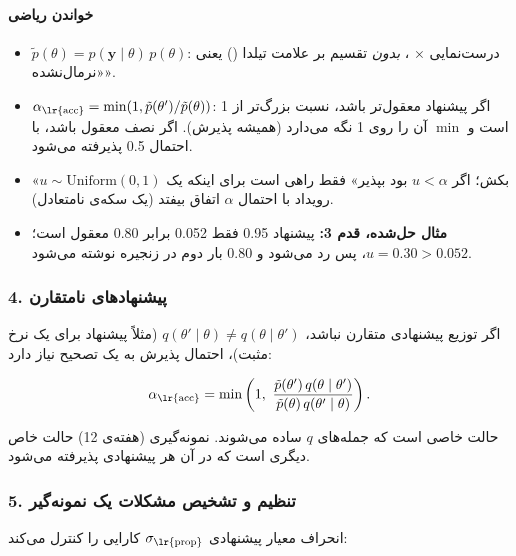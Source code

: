 \paragraph{خواندن ریاضی}

\begin{itemize}
\tightlist
\item
  \(\tilde p(\theta) = p(\mathbf{y}\mid\theta)\,p(\theta)\): درست‌نمایی ×
  ، \emph{بدون} تقسیم بر  علامت تیلدا
  (\lr{\textasciitilde}) یعنی «نرمال‌نشده».
\item
  \(\alpha_{\text{\lr{acc}}} = \min(1, \tilde p(\theta')/\tilde p(\theta))\):
  اگر پیشنهاد معقول‌تر باشد، نسبت بزرگ‌تر از 1 است و \(\min\) آن را روی 1
  نگه می‌دارد (همیشه پذیرش). اگر نصف معقول باشد، با احتمال 0.5 پذیرفته
  می‌شود.
\item
  «\(u \sim \mathrm{Uniform}(0,1)\) بکش؛ اگر \(u < \alpha\) بود بپذیر»
  فقط راهی است برای اینکه یک رویداد با احتمال \(\alpha\) اتفاق بیفتد (یک
  سکه‌ی نامتعادل).
\item
  \textbf{مثال حل‌شده، قدم 3:} پیشنهاد 0.95 فقط 0.052 برابر 0.80 معقول
  است؛ \(u = 0.30 > 0.052\)، پس رد می‌شود و 0.80 بار دوم در زنجیره نوشته
  می‌شود.
\end{itemize}

\subsubsection{\texorpdfstring{4.  پیشنهادهای
نامتقارن}{4. Metropolis\lr{--}Hastings: پیشنهادهای نامتقارن}}

اگر توزیع پیشنهادی متقارن نباشد،
\(q(\theta'\mid\theta) \ne q(\theta\mid\theta')\) (مثلاً پیشنهاد
 برای یک نرخ مثبت)، احتمال پذیرش به یک تصحیح نیاز دارد:

\[
\alpha_{\text{\lr{acc}}} = \min\left(1,\ \frac{\tilde p(\theta')\, q(\theta \mid \theta')}{\tilde p(\theta)\, q(\theta' \mid \theta)}\right).
\]

 حالت خاصی است که جمله‌های \(q\) ساده می‌شوند. نمونه‌گیری
 (هفته‌ی 12) حالت خاص دیگری است که در آن هر پیشنهادی پذیرفته
می‌شود.

\subsubsection{5. تنظیم و تشخیص مشکلات یک نمونه‌گیر}

انحراف معیار پیشنهادی \(\sigma_{\text{\lr{prop}}}\) کارایی را کنترل می‌کند:

